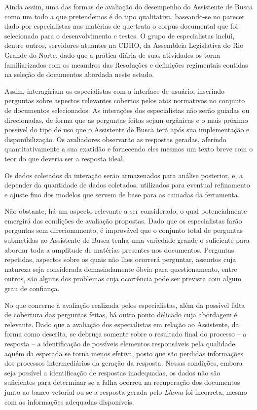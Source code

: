 Ainda assim, uma das formas de avaliação do desempenho do Assistente de Busca como um todo a que pretendemos é do tipo qualitativa, baseando-se no parecer dado por especialistas nas matérias de que trata o corpus documental que foi selecionado para o desenvolvimento e testes. O grupo de especialistas inclui, dentre outros, servidores atuantes na \ac{CDHO}, da Assembleia Legislativa do Rio Grande do Norte, dado que a prática diária de suas atividades os torna familiarizados com os meandros das Resoluções e definições regimentais contidas na seleção de documentos abordada neste estudo.

Assim, interagiriam os especialistas com a interface de usuário, inserindo perguntas sobre aspectos relevantes cobertos pelos atos normativos no conjunto de documentos selecionados. As interações dos especialistas não serão guiadas ou direcionadas, de forma que as perguntas feitas sejam orgânicas e o mais próximo possível do tipo de uso que o Assistente de Busca terá após sua implementação e disponibilização. Os avaliadores observarão as respostas geradas, aferindo quantitativamente a sua exatidão e fornecendo eles mesmos um texto breve com o teor do que deveria ser a resposta ideal.

Os dados coletados da interação serão armazenados para análise posterior, e, a depender da quantidade de dados coletados, utilizados para eventual refinamento e ajuste fino dos modelos que servem de base para as camadas da ferramenta.

Não obstante, há um aspecto relevante a ser considerado, o qual potencialmente emergirá das condições de avaliação propostas. Dado que os especialistas farão perguntas sem direcionamento, é improvável que o conjunto total de perguntas submetidas ao Assistente de Busca tenha uma variedade grande o suficiente para abordar toda a amplitude de matérias presentes nos documentos. Perguntas repetidas, aspectos sobre os quais não lhes ocorrerá perguntar, assuntos cuja natureza seja considerada demasiadamente óbvia para questionamento, entre outros, são alguns dos problemas cuja ocorrência pode ser prevista com algum grau de confiança.

No que concerne à avaliação realizada pelos especialistas, além da possível falta de cobertura das perguntas feitas, há outro ponto delicado cuja abordagem é relevante. Dado que a avaliação dos especialistas em relação ao Assistente, da forma como descrita, se debruça somente sobre o resultado final do processo -- a resposta -- a identificação de possíveis elementos responsáveis pela qualidade aquém da esperada se torna menos efetiva, posto que são perdidas informações dos processos intermediários da geração da resposta. Nessas condições, embora seja possível a identificação de respostas inadequadas, os dados não são suficientes para determinar se a falha ocorreu na recuperação dos documentos junto ao banco vetorial ou se a resposta gerada pelo \textit{Llama} foi incorreta, mesmo com as informações adequadas disponíveis.

